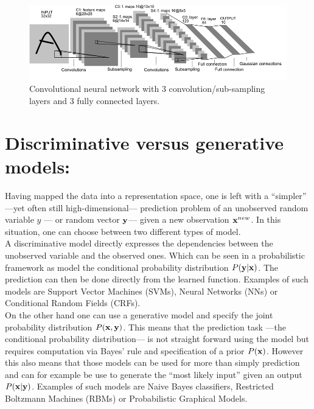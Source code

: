 \documentclass[a4paper,11pt]{report}
\begin{document}
			\begin{figure}[h]
				\begin{center}
					\includegraphics[width=5in]{CNN.png}
					\caption[Convolutional neural network.]{\centering  Convolutional neural network with $3$ convolution/sub-sampling layers and $3$ fully connected layers. }
					\label{fig:SNN}
				\end{center}	
      \end{figure}
			
			         
	\section{Discriminative versus generative models:}
		\label{sec:Intro/Discr vs gen}
		
		Having mapped the data into a representation space, one is left with a ``simpler'' ---yet often still high-dimensional--- prediction problem of an unobserved random variable $y$ --- or random vector ${\bf y}$--- given a new observation ${\bf x}^{new}$. In this situation, one can choose between two different types of model.\\
		
		A discriminative model directly expresses the dependencies between the unobserved variable and the observed ones. Which can be seen in a probabilistic framework as model the conditional probability distribution $P({\bf y}|{\bf x})$. The prediction can then be done directly from the learned function. Examples of such models are Support Vector Machines (SVMs), Neural Networks (NNs) or Conditional Random Fields (CRFs).\\
		
		On the other hand one can use a generative model and specify the joint probability distribution $P({\bf x},{\bf y})$. This means that the prediction task ---\ie the conditional probability distribution--- is not straight forward using the model but requires computation via Bayes' rule and specification of a prior $P({\bf x})$. However this also means that those models can be used for more than simply prediction and can for example be use to generate the ``most likely input'' given an output $P({\bf x}|{\bf y})$. Examples of such models are Naive Bayes classifiers, Restricted Boltzmann Machines (RBMs) or Probabilistic Graphical Models.\\
		
\end{document}
